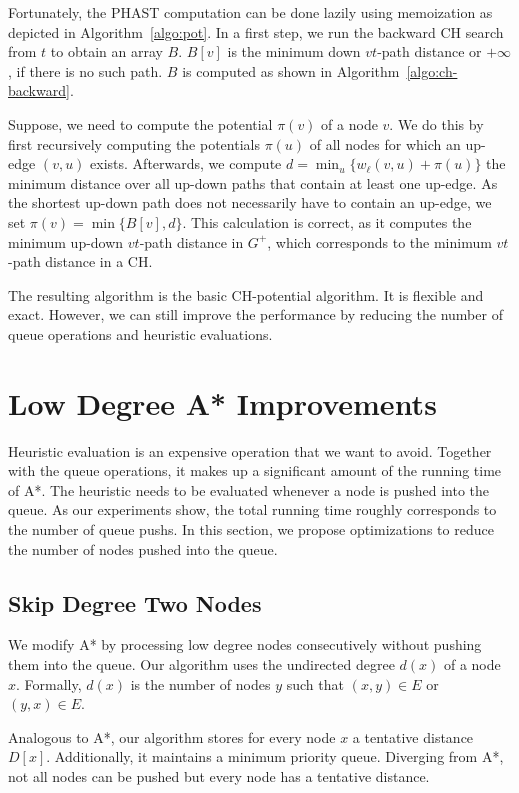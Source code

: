 \documentclass[letterpaper]{article} %
\begin{document}
Fortunately, the PHAST computation can be done lazily using memoization as depicted in Algorithm~\ref{algo:pot}.
In a first step, we run the backward CH search from $t$ to obtain an array $B$.
$B[v]$ is the minimum down $vt$-path distance or $+\infty$, if there is no such path.
$B$ is computed as shown in Algorithm~\ref{algo:ch-backward}.

Suppose, we need to compute the potential $\pi(v)$ of a node $v$.
We do this by first recursively computing the potentials $\pi(u)$ of all nodes for which an up-edge $(v,u)$ exists.
Afterwards, we compute $d = \min_u\{w_\ell(v,u) + \pi(u)\}$ the minimum distance over all up-down paths that contain at least one up-edge.
As the shortest up-down path does not necessarily have to contain an up-edge, we set $\pi(v) = \min \{ B[v], d \}$.
This calculation is correct, as it computes the minimum up-down $vt$-path distance in $G^+$, which corresponds to the minimum $vt$-path distance in a CH.

The resulting algorithm is the basic CH-potential algorithm.
It is flexible and exact.
However, we can still improve the performance by reducing the number of queue operations and heuristic evaluations.

\section{Low Degree A* Improvements}

\label{sec:low-deg-improvment}

Heuristic evaluation is an expensive operation that we want to avoid.
Together with the queue operations, it makes up a significant amount of the running time of A*.
The heuristic needs to be evaluated whenever a node is pushed into the queue.
As our experiments show, the total running time roughly corresponds to the number of queue pushs.
In this section, we propose optimizations to reduce the number of nodes pushed into the queue.

\subsection{Skip Degree Two Nodes}

We modify A* by processing low degree nodes consecutively without pushing them into the queue.
Our algorithm uses the undirected degree $d(x)$ of a node $x$.
Formally, $d(x)$ is the number of nodes $y$ such that $(x,y)\in E$ or $(y,x)\in E$.

Analogous to A*, our algorithm stores for every node $x$ a tentative distance $D[x]$.
Additionally, it maintains a minimum priority queue.
Diverging from A*, not all nodes can be pushed but every node has a tentative distance.
\end{document}

